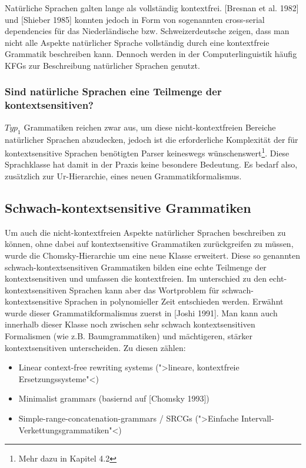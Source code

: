 \documentclass[12pt,a4paper]{article}
\theoremstyle{definition}
\begin{document}
			Natürliche Sprachen galten lange als vollständig kontextfrei. [Bresnan et al. 1982] und [Shieber 1985] konnten jedoch in Form von sogenannten cross-serial dependencies für das Niederländische bzw. Schweizerdeutsche zeigen, dass man nicht alle Aspekte natürlicher Sprache vollständig durch eine kontextfreie Grammatik beschreiben kann. Dennoch werden in der Computerlinguistik häufig KFGs zur Beschreibung natürlicher Sprachen genutzt.
		
		\subsubsection{Sind natürliche Sprachen eine Teilmenge der kontextsensitiven?}
			$Typ_1$ Grammatiken reichen zwar aus, um diese nicht-kontextfreien Bereiche natürlicher Sprachen abzudecken, jedoch ist die erforderliche Komplexität der für kontextsensitive Sprachen benötigten Parser keineswegs wünschenswert\footnote{Mehr dazu in Kapitel 4.2}. Diese Sprachklasse hat damit in der Praxis keine besondere Bedeutung. Es bedarf also, zusätzlich zur Ur-Hierarchie, eines neuen Grammatikformalismus.
		
	\subsection{Schwach-kontextsensitive Grammatiken}
		Um auch die nicht-kontextfreien Aspekte natürlicher Sprachen beschreiben zu können, ohne dabei auf kontextsensitive Grammatiken zurückgreifen zu müssen, wurde die Chomsky-Hierarchie  um eine neue Klasse erweitert. Diese so genannten schwach-kontextsensitiven Grammatiken bilden eine echte Teilmenge der kontextsensitiven und umfassen die kontextfreien. Im unterschied zu den echt-kontextsensitiven Sprachen kann aber das Wortproblem für schwach-kontextsensitive Sprachen in polynomieller Zeit entschieden werden. Erwähnt wurde dieser Grammatikformalismus zuerst in [Joshi 1991]. Man kann auch innerhalb dieser Klasse noch zwischen sehr schwach kontextsensitiven Formalismen (wie z.B. Baumgrammatiken) und mächtigeren, stärker kontextsensitiven unterscheiden. Zu diesen zählen:
		
			\begin{itemize}
			\item{Linear context-free rewriting systems (">lineare, kontextfreie Ersetzungssysteme"<)}
			\item{Minimalist grammars (basiernd auf [Chomsky 1993])}
			\item{Simple-range-concatenation-grammars / SRCGs (">Einfache Intervall-Verkettungsgrammatiken"<)}
			\end{itemize}
		
\end{document}
